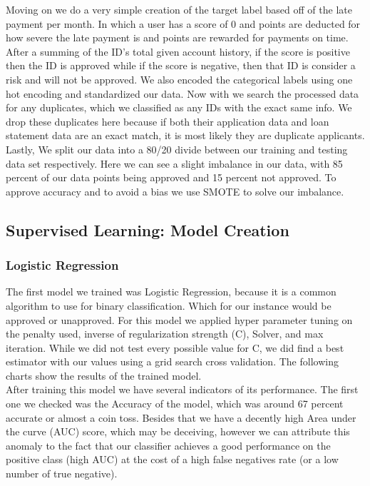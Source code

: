 \documentclass[12pt]{article}
\begin{document}
\noindent Moving on we do a very simple creation of the target label based off of the late payment per month. In which a user has a score of 0 and points are deducted for how severe the late payment is and points are rewarded for payments on time. After a summing of the ID's total given account history, if the score is positive then the ID is approved while if the score is negative, then that ID is consider a risk and will not be approved. We also encoded the categorical labels using one hot encoding and standardized our data. Now with we search the processed data for any duplicates, which we classified as any IDs with the exact same info. We drop these duplicates here because if both their application data and loan statement data are an exact match, it is most likely they are duplicate applicants.\\

\noindent Lastly, We split our data into a 80/20 divide between our training and testing data set respectively. Here we can see a slight imbalance in our data, with 85 percent of our data points being approved and 15 percent not approved. To approve accuracy and to avoid a bias we use SMOTE to solve our imbalance.\\

\subsection{Supervised Learning: Model Creation}

\subsubsection{Logistic Regression}

\noindent The first model we trained was Logistic Regression, because it is a common algorithm to use for binary classification. Which for our instance would be approved or unapproved. For this model we applied hyper parameter tuning on the penalty used, inverse of regularization strength (C), Solver, and max iteration. While we did not test every possible value for C, we did find a best estimator with our values using a grid search cross validation. The following charts show the results of the trained model.\\

\noindent After training this model we have several indicators of its performance. The first one we checked was the Accuracy of the model, which was around 67 percent accurate or almost a coin toss. Besides that we have a decently high Area under the curve (AUC) score, which may be deceiving, however we can attribute this anomaly to the fact that our classifier achieves a good performance on the positive class (high AUC) at the cost of a high false negatives rate (or a low number of true negative). \\
\end{document}
